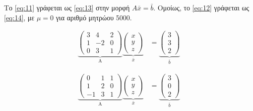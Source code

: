 \documentclass[14pt]{extreport}
\begin{document}
Το \eqref{eq:11} γράφεται ως \eqref{eq:13} στην μορφή $A\bar{x}=\bar{b}$. Ομοίως, το \eqref{eq:12} γράφεται ως \eqref{eq:14},  με $\mu = 0$ για αριθμό μητρώου 5000.

\begin{equation}%
    \begin{aligned}
        \underbrace{
            \begin{pmatrix}
                3 & 4  & 2 \\
                1 & -2 & 0 \\
                0 & 3  & 1
            \end{pmatrix}
        }_\text{A}
        \underbrace{
            \begin{pmatrix}
                x \\
                y \\
                z
            \end{pmatrix}
        }_\text{$\bar{x}$}
         & =
        \underbrace{
            \begin{pmatrix}
                3 \\
                3 \\
                2
            \end{pmatrix}
        }_\text{$\bar{b}$}
    \end{aligned}\label{eq:13}
\end{equation}

\begin{equation}%
    \begin{aligned}
        \underbrace{
            \begin{pmatrix}
                0  & 1 & 1 \\
                1  & 2 & 0 \\
                -1 & 3 & 1
            \end{pmatrix}
        }_\text{A}
        \underbrace{
            \begin{pmatrix}
                x \\
                y \\
                z
            \end{pmatrix}
        }_\text{$\bar{x}$}
         & =
        \underbrace{
            \begin{pmatrix}
                3 \\
                0 \\
                2
            \end{pmatrix}
        }_\text{$\bar{b}$}
    \end{aligned}\label{eq:14}
\end{equation}
\end{document}
